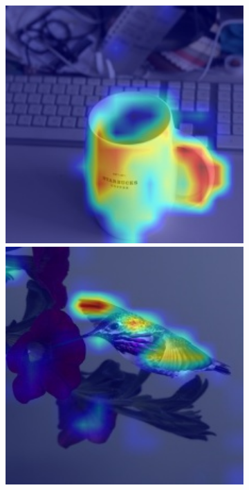 \begin{figure}[t]
\begin{subfigure}[b]{0.19\textwidth}
        \includegraphics[width=1\textwidth]{figures/qualitative_results/ILSVRC2012_val_00016576_deit_small_patch16_224.JPEG}
        \includegraphics[width=1\textwidth]{figures/qualitative_results/ILSVRC2012_val_00005779_deit_small_patch16_224.JPEG}

\end{subfigure}
\end{figure}

